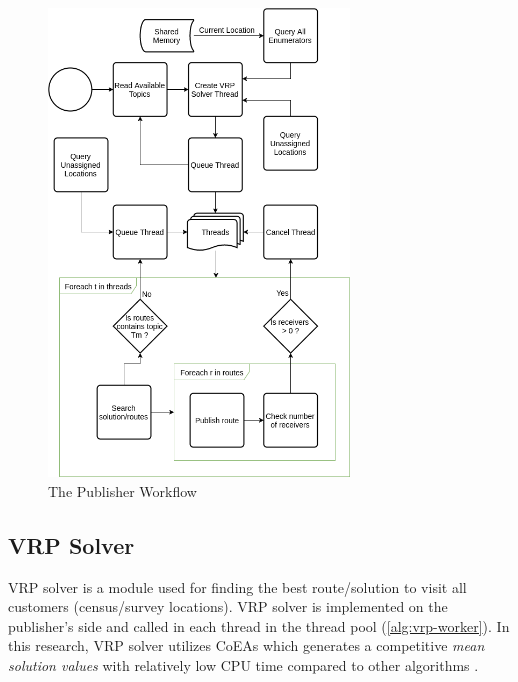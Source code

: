 \documentclass[conference]{IEEEtran}
\begin{document}
\begin{figure}[!]
	\centering
	\includegraphics[width=8cm]{Resources/Images/publisher-algorithm}
	\caption{The Publisher Workflow}
	\label{fig:publisher-algorithm}
\end{figure} 


\subsection{VRP Solver}
\label{ssec:vrp-solver}
VRP solver is a module used for finding the best route/solution to visit all customers (census/survey locations). VRP solver is implemented on the publisher's side and called in each thread in the thread pool (\autoref{alg:vrp-worker}). In this research, VRP solver utilizes CoEAs which generates a competitive \textit{mean solution values} with relatively low CPU time compared to other algorithms \cite{de_oliveira_cooperative_2016}. 
\end{document}
